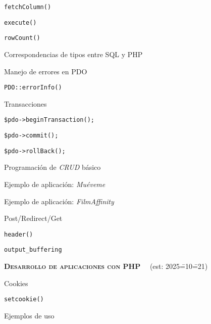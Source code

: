 \begin{longenum}
\begin{longenum}
\begin{longenum}
\begin{longenum}
                \item \texttt{fetchColumn()}
                \item \texttt{execute()}
                \item \texttt{rowCount()}
            \end{longenum}
            \item Correspondencias de tipos entre SQL y PHP
            \item Manejo de errores en PDO
            \begin{longenum}
                \item \texttt{PDO::errorInfo()}
            \end{longenum}
            \item Transacciones
            \begin{longenum}
                \item \texttt{\$pdo->beginTransaction();}
                \item \texttt{\$pdo->commit();}
                \item \texttt{\$pdo->rollBack();}
            \end{longenum}
        \end{longenum}
        \item Programación de \textit{CRUD} básico
        \begin{longenum}
            \item Ejemplo de aplicación: \textit{Muéveme} 
            \item Ejemplo de aplicación: \textit{FilmAffinity} 
        \end{longenum}
        \item Post/Redirect/Get
        \item \texttt{header()}
        \begin{longenum}
            \item \texttt{output\_buffering}
        \end{longenum}
    \end{longenum}
    \item \textbf{\textsc{Desarrollo de aplicaciones con PHP}} \ \ (est: 2025\==10\==21)
    \begin{longenum}
        \item Cookies
        \begin{longenum}
            \item \texttt{setcookie()}
            \item Ejemplos de uso
        \end{longenum}

\end{longenum}
\end{longenum}
